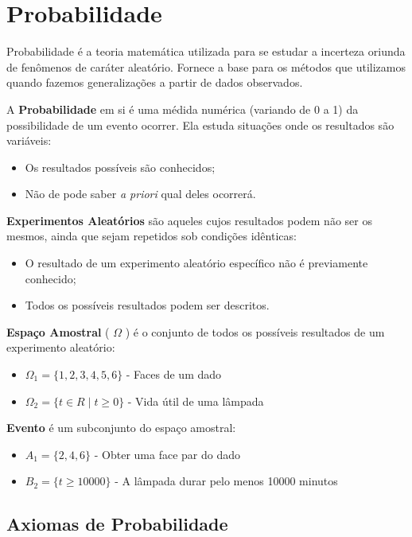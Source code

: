 \chapter{Probabilidade}

Probabilidade é a teoria matemática utilizada para se estudar a incerteza oriunda de fenômenos de caráter aleatório. Fornece a base para os métodos que utilizamos quando fazemos generalizações a partir de dados observados.

A \textbf{Probabilidade} em si é uma médida numérica (variando de 0 a 1) da possibilidade de um evento ocorrer. Ela estuda situações onde os resultados são variáveis:
\begin{itemize}
	\item Os resultados possíveis são conhecidos;
	\item Não de pode saber \textit{a priori} qual deles ocorrerá.
\end{itemize}

\textbf{Experimentos Aleatórios} são aqueles cujos resultados podem não ser os mesmos, ainda que sejam repetidos sob condições idênticas:
\begin{itemize}
	\item O resultado de um experimento aleatório específico não é previamente conhecido;
	\item Todos os possíveis resultados podem ser descritos.
\end{itemize}

\textbf{Espaço Amostral} ( \(\Omega\) ) é o conjunto de todos os possíveis resultados de um experimento aleatório:
\begin{itemize}
	\item \(\Omega_1 = \{ 1, 2, 3, 4, 5, 6 \} \) - Faces de um dado
	\item \(\Omega_2 = \{ t \in R \mid t \geq 0 \} \) - Vida útil de uma lâmpada
\end{itemize}

\textbf{Evento} é um subconjunto do espaço amostral:
\begin{itemize}
	\item \(A_1 = \{ 2, 4, 6 \} \) - Obter uma face par do dado
	\item \(B_2 = \{ t \geq 10000 \} \) - A lâmpada durar pelo menos 10000 minutos
\end{itemize}

\section{Axiomas de Probabilidade}

